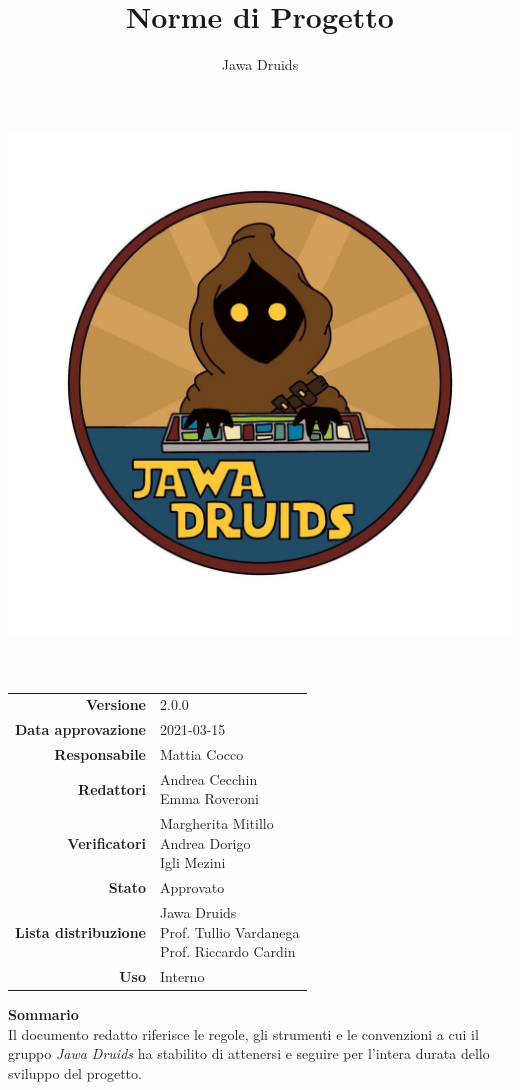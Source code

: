 



\makeatletter
\begin{titlepage}
	\begin{center}
		\vspace*{-4cm}
		\author{Jawa Druids} 
		\title{Norme di Progetto}
		\date{} %
		\includegraphics[width=0.5\linewidth]{../immagini/DRUIDSLOGO.jpg}\\[4ex]
		{\huge \bfseries  \@title }\\[2ex] 
		{\LARGE  \@author}\\[50ex]
		\vspace*{-9cm}
		\begin{table}[H]
			\renewcommand{\arraystretch}{1.4}
			\centering
			\begin{tabular}{r | l}
				\textbf{Versione} & 2.0.0 \\%
				\textbf{Data approvazione} & 2021-03-15\\
				\textbf{Responsabile} & Mattia Cocco \\
				\textbf{Redattori} & \makecell[tl]{Andrea Cecchin \\ Emma Roveroni} \\		
				\textbf{Verificatori} & \makecell[tl]{Margherita Mitillo \\ Andrea Dorigo \\ Igli Mezini} \\
				\textbf{Stato} & Approvato\\
				\textbf{Lista distribuzione} & \makecell[tl]{Jawa Druids \\ Prof. Tullio Vardanega \\ Prof. Riccardo Cardin}\\
				\textbf{Uso} & Interno     
			\end{tabular}
		\end{table}
		\vspace{0.1cm}
		\hfill \break
		\fontsize{17}{10}\textbf{Sommario} \\
		\vspace{0.1cm}
		Il documento redatto riferisce le regole, gli strumenti e le convenzioni a cui il gruppo \emph{\normalsize{\textit{Jawa Druids}}} ha stabilito di attenersi e seguire per l'intera durata dello sviluppo del progetto.
	\end{center}
\end{titlepage}
\makeatother
	

